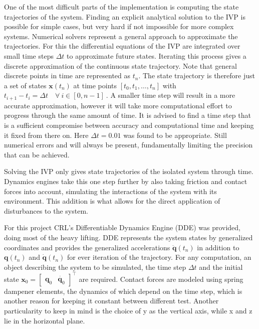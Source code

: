 One of the most difficult parts of the implementation is computing the state trajectories of the system. 
Finding an explicit analytical solution to the IVP is possible for simple cases, but very hard if not impossible for more complex systems. Numerical solvers represent a general approach to approximate the trajectories. For this the differential equations of the IVP are integrated over small time steps $\Delta t$ to approximate future states.
Iterating this process gives a discrete approximation of the continuous state trajectory. Note that general discrete points in time are represented as $t_n$.
The state trajectory is therefore just a set of states $\mathbf{x}(t_n)$ at time points $[t_0,t_1,\ldots, t_n]$ with $t_{i+1}-t_{i} = \Delta t\quad \forall\ i \in [0,n-1]\ $.
A smaller time step will result in a more accurate approximation, however it will take more computational effort to progress through the same amount of time.
It is advised to find a time step that is a sufficient compromise between accuracy and computational time and keeping it fixed from there on. Here $\Delta t = 0.01$ was found to be appropriate. 
Still numerical errors and will always be present, fundamentally limiting the precision that can be achieved. 

Solving the IVP only gives state trajectories of the isolated system through time.  Dynamics engines take this one step further by also taking friction and contact forces into account, simulating the interactions of the system with its environment. This addition is what allows for the direct application of disturbances to the system.

For this project CRL's Differentiable Dynamics Engine (DDE) was provided, doing most of the heavy lifting. %
DDE represents the system states by generalized coordinates and provides the generalized accelerations $\ddot{\mathbf{q}}(t_n)$ in addition to $\mathbf{q}(t_n)$ and $\dot{\mathbf{q}}(t_n)$ for ever iteration of the trajectory. For any computation, an object describing the system to be simulated, the time step $\Delta t$ and the initial state $\mathbf{x}_0 = \begin{bmatrix} \mathbf{q}_0&\dot{\mathbf{q}_0}\end{bmatrix}^\intercal$ are required. Contact forces are modeled using spring dampener elements, the dynamics of which depend on the time step, which is another reason for keeping it constant between different test. Another particularity to keep in mind is the choice of y as the vertical axis, while x and z lie in the horizontal plane. 


